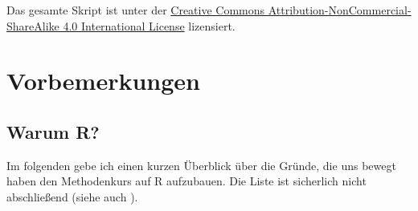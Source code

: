 \documentclass[]{tufte-book}
\begin{document}
Das gesamte Skript ist unter der
\href{http://creativecommons.org/licenses/by-nc-sa/4.0/}{Creative
Commons Attribution-NonCommercial-ShareAlike 4.0 International License}
lizensiert.

\chapter{Vorbemerkungen}\label{precons}

\section{Warum R?}\label{warum-r}

Im folgenden gebe ich einen kurzen Überblick über die Gründe, die uns
bewegt haben den Methodenkurs auf R aufzubauen. Die Liste ist sicherlich
nicht abschließend (siehe auch \citet{adv-r}).
\end{document}
